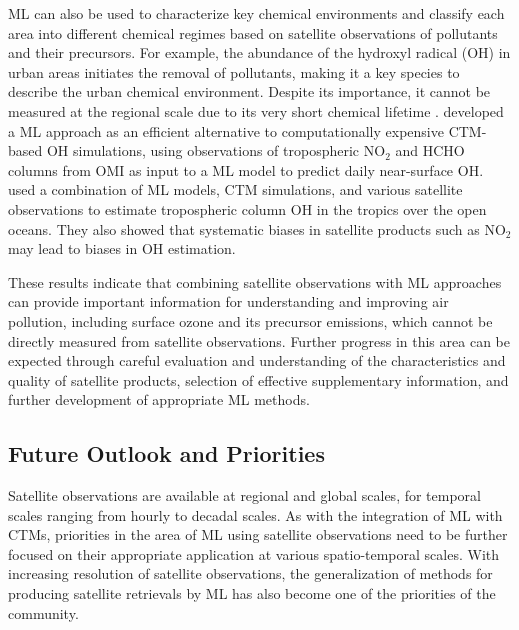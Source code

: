 \documentclass[gmd, manuscript]{copernicus}
\begin{document}
ML can also be used to characterize key chemical environments and classify each area into different chemical regimes based on satellite observations of pollutants and their precursors. For example, the abundance of the hydroxyl radical (OH) in urban areas initiates the removal of pollutants, making it a key species to describe the urban chemical environment. Despite its importance, it cannot be measured at the regional scale due to its very short chemical lifetime \citep{duncan_opinion_2024}. \citet{zhu_combining_2022} developed a ML approach as an efficient alternative to computationally expensive CTM-based OH simulations, using observations of tropospheric NO$_2$ and HCHO columns from OMI as input to a ML model to predict daily near-surface OH. \citet{anderson_technical_2023} used a combination of ML models, CTM simulations, and various satellite observations to estimate tropospheric column OH in the tropics over the open oceans. They also showed that systematic biases in satellite products such as NO$_2$ may lead to biases in OH estimation.

These results indicate that combining satellite observations with ML approaches can provide important information for understanding and improving air pollution, including surface ozone and its precursor emissions, which cannot be directly measured from satellite observations. Further progress in this area can be expected through careful evaluation and understanding of the characteristics and quality of satellite products, selection of effective supplementary information, and further development of appropriate ML methods.


\subsection{Future Outlook and Priorities}


Satellite observations are available at regional and global scales, for temporal scales ranging from hourly to decadal scales. As with the integration of ML with CTMs, priorities in the area of ML using satellite observations need to be further focused on their appropriate application at various spatio-temporal scales. With  increasing resolution of satellite observations, the generalization of methods for producing satellite retrievals by ML has also become one of the priorities of the community.
\end{document}
